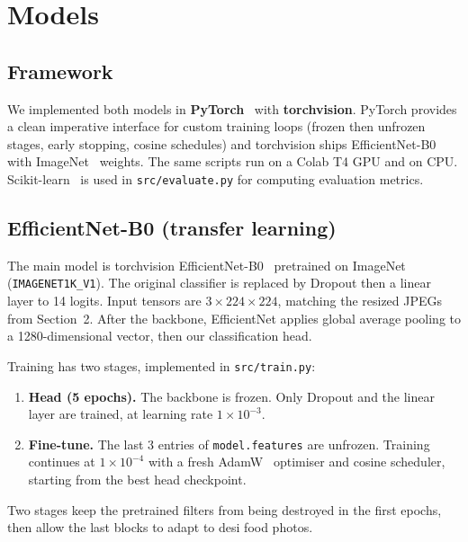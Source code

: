 \section{Models}

\subsection{Framework}
We implemented both models in \textbf{PyTorch}~\cite{paszke2019pytorch} with
\textbf{torchvision}. PyTorch provides a clean imperative interface for custom
training loops (frozen then unfrozen stages, early stopping, cosine schedules)
and torchvision ships EfficientNet-B0~\cite{tan2019efficientnet} with
ImageNet~\cite{deng2009imagenet} weights. The same scripts run on a Colab T4
GPU and on CPU. Scikit-learn~\cite{pedregosa2011sklearn} is used in
\texttt{src/evaluate.py} for computing evaluation metrics.

\subsection{EfficientNet-B0 (transfer learning)}
The main model is torchvision EfficientNet-B0~\cite{tan2019efficientnet}
pretrained on ImageNet~\cite{deng2009imagenet} (\texttt{IMAGENET1K\_V1}). The
original classifier is replaced by Dropout then a linear layer to 14 logits.
Input tensors are $3 \times 224 \times 224$, matching the resized JPEGs from
Section~2. After the backbone, EfficientNet applies global average pooling to a
1280-dimensional vector, then our classification head.

Training has two stages, implemented in \texttt{src/train.py}:
\begin{enumerate}
  \item \textbf{Head (5 epochs).} The backbone is frozen. Only Dropout and
        the linear layer are trained, at learning rate $1 \times 10^{-3}$.
  \item \textbf{Fine-tune.} The last 3 entries of \texttt{model.features}
        are unfrozen. Training continues at $1 \times 10^{-4}$ with a fresh
        AdamW~\cite{loshchilov2019adamw} optimiser and cosine scheduler,
        starting from the best head checkpoint.
\end{enumerate}
Two stages keep the pretrained filters from being destroyed in the first
epochs, then allow the last blocks to adapt to desi food photos.

